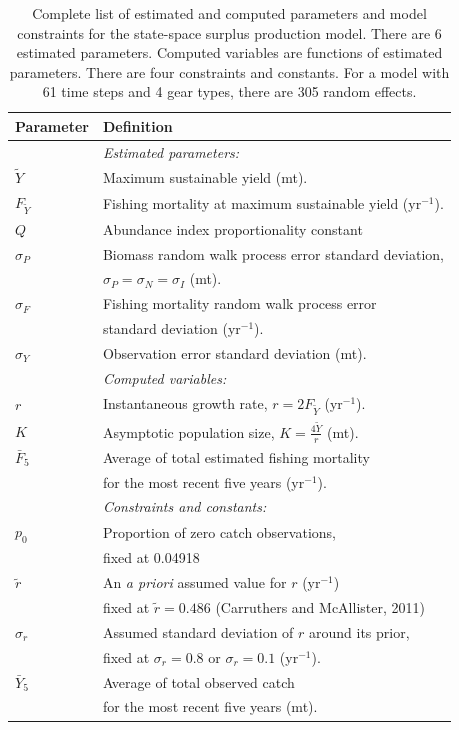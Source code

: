\documentclass[12pt,letterpaper]{article}
\newcommand\peryr{yr$^{-1}$}
\newcommand\MSY{\widetilde{Y}}
\newcommand\Fmsy{F_{\MSY}}
\begin{document}
\begin{table}
\caption{Complete list of estimated and computed parameters and model
constraints for the state-space surplus production model. 
There are 6 estimated parameters. 
Computed variables are functions of estimated parameters.
There are four constraints and constants.
For a model with 61 time steps and 4 gear types, there are 305 random effects.
}
\label{tab:allvars1}
\begin{center}
\begin{tabular}{ll}
\hline
Parameter & Definition\\
\hline
\hline
       & {\it Estimated parameters:}\\
$\MSY$ & Maximum sustainable yield (mt).\\
$\Fmsy$& Fishing mortality at maximum sustainable yield (\peryr).\\
$Q$    & Abundance index proportionality constant\\
$\sigma_P$ & Biomass random walk process error standard deviation,\\
           & $\sigma_P=\sigma_N=\sigma_I$ (mt).\\
$\sigma_F$ & Fishing mortality random walk process error\\
           & standard deviation (\peryr).\\
$\sigma_Y$ & Observation error standard deviation (mt).\\
\hline
       & {\it Computed variables:}\\
$r$    & Instantaneous growth rate, $r=2F_{\MSY}$ (\peryr).\\
$K$    & Asymptotic population size, $K=\frac{4\MSY}{r}$ (mt).\\
$\bar{F}_5$ & Average of total estimated fishing mortality\\
            & for the most recent five years (\peryr).\\
\hline
       & {\it Constraints and constants:}\\
$p_0$  & Proportion of zero catch observations,\\
       & fixed at 0.04918\\
$\tilde{r}$ & An {\it a priori} assumed value for $r$ (\peryr)\\
            & fixed at $\tilde{r}=0.486$ (Carruthers and McAllister, 2011)\\
$\sigma_r$  & Assumed standard deviation of $r$ around its prior,\\
            & fixed at $\sigma_r=0.8$ or $\sigma_r=0.1$ (\peryr).\\
$\bar{Y}_5$ & Average of total observed catch\\
            & for the most recent five years (mt).\\
\hline
\end{tabular}
\end{center}
\end{table}
\end{document}
